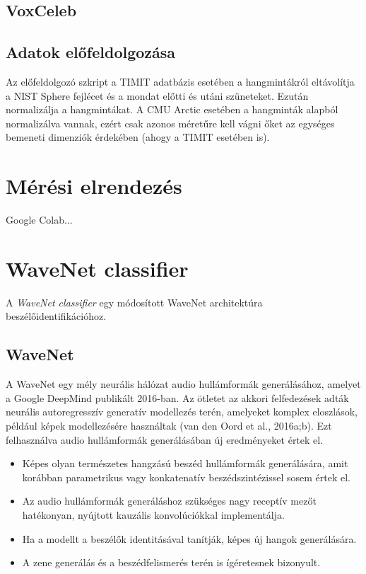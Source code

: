 \subsection{VoxCeleb}



\subsection{Adatok előfeldolgozása}

Az előfeldolgozó szkript a TIMIT adatbázis esetében a hangmintákról eltávolítja a NIST Sphere fejlécet és a mondat előtti és utáni szüneteket. Ezután normalizálja a hangmintákat. A CMU Arctic esetében a hangminták alapból normalizálva vannak, ezért csak azonos méretűre kell vágni őket az egységes bemeneti dimenziók érdekében (ahogy a TIMIT esetében is).

\section{Mérési elrendezés}

Google Colab...

\section{WaveNet classifier}

A \emph{WaveNet classifier} egy módosított WaveNet architektúra beszélőidentifikációhoz.

\subsection{WaveNet}

A WaveNet egy mély neurális hálózat audio hullámformák generálásához, amelyet a Google DeepMind publikált 2016-ban. Az ötletet az akkori felfedezések adták neurális autoregresszív generatív modellezés terén, amelyeket komplex eloszlások, például képek modellezésére használtak (van den Oord et al., 2016a;b). Ezt felhasználva audio hullámformák generálásában új eredményeket értek el.

\begin{itemize}
	\item Képes olyan természetes hangzású beszéd hullámformák generálására, amit korábban parametrikus vagy konkatenatív beszédszintézissel sosem értek el. 
	\item Az audio hullámformák generáláshoz szükséges nagy receptív mezőt hatékonyan, nyújtott kauzális konvolúciókkal implementálja.
	\item Ha a modellt a beszélők identitásával tanítják, képes új hangok generálására.
	\item A zene generálás és a beszédfelismerés terén is ígéretesnek bizonyult.
\end{itemize}

